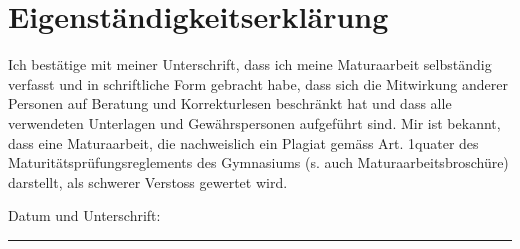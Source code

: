\chapter{Eigenständigkeitserklärung}\label{cha:eigenständigkeitserklärung}
Ich bestätige mit meiner Unterschrift, dass ich meine Maturaarbeit selbständig verfasst und in schriftliche Form gebracht habe, dass sich die Mitwirkung anderer Personen auf Beratung und Korrekturlesen beschränkt hat und dass alle verwendeten Unterlagen und Gewährspersonen aufgeführt sind. Mir ist bekannt, dass eine Maturaarbeit, die nachweislich ein Plagiat gemäss Art. 1quater des Maturitätsprüfungsreglements des Gymnasiums (s. auch Maturaarbeitsbroschüre) darstellt, als schwerer Verstoss gewertet wird.
\vspace{1.5cm}

\noindent Datum und Unterschrift: \rule[-2mm]{11cm}{0.4pt} 